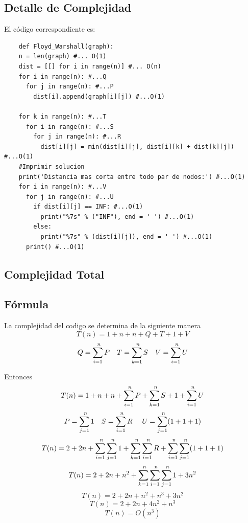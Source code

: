 \subsection*{Detalle de Complejidad}

El código correspondiente es:
\begin{lstlisting}
	def Floyd_Warshall(graph):
	n = len(graph) #... O(1)
	dist = [[] for i in range(n)] #... O(n)
	for i in range(n): #...Q
	  for j in range(n): #...P
		dist[i].append(graph[i][j]) #...O(1)
  
	for k in range(n): #...T
	  for i in range(n): #...S
		for j in range(n): #...R
		  dist[i][j] = min(dist[i][j], dist[i][k] + dist[k][j]) #...O(1)
	#Imprimir solucion
	print('Distancia mas corta entre todo par de nodos:') #...O(1)
	for i in range(n): #...V
	  for j in range(n): #...U
		if dist[i][j] == INF: #...O(1)
		  print("%7s" % ("INF"), end = ' ') #...O(1)
		else:
		  print("%7s" % (dist[i][j]), end = ' ') #...O(1)
	  print() #...O(1)

\end{lstlisting}

\subsection*{Complejidad Total}
\subsection*{Fórmula }
La complejidad del codigo se determina de la siguiente manera
\[T(n) = 1 + n + n + Q + T + 1 + V\]
\[ Q = \sum_{i = 1}^{\\n} P \quad T = \sum_{k = 1}^{\\n} S \quad V = \sum_{i = 1}^{\\n} U \]

Entonces
\[T(n) = 1 + n + n + \sum_{i = 1}^{\\n} P + \sum_{k = 1}^{\\n} S  + 1 + \sum_{i = 1}^{\\n} U \]
\[P = \sum_{j = 1}^{\\n} 1 \quad S = \sum_{i = 1}^{\\n} R\ \quad U = \sum_{j = 1}^{\\n} (1+1+1) \]
\[T(n) = 2 + 2n + \sum_{i = 1}^{\\n} \sum_{j = 1}^{\\n} 1 + \sum_{k = 1}^{\\n} \sum_{i = 1}^{\\n} R + \sum_{i = 1}^{\\n} \sum_{j = 1}^{\\n} (1 + 1 + 1) \]
\[T(n) = 2 + 2n + n^2 + \sum_{k = 1}^{\\n} \sum_{i = 1}^{\\n} \sum_{j = 1}^{\\n} 1 + 3n^2 \]
\[T(n) = 2 + 2n + n^2 + n^3 + 3n^2 \]
\[T(n) = 2 + 2n + 4n^2 + n^3 \]
\[T(n) = O(n^3)\]

